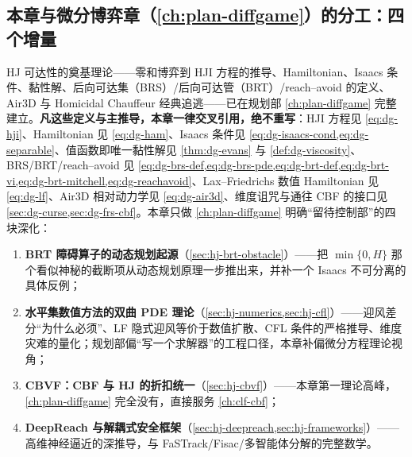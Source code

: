 \subsection*{本章与微分博弈章（\texorpdfstring{\cref{ch:plan-diffgame}}{差分博弈章}）的分工：四个增量}

HJ 可达性的奠基理论——零和博弈到 HJI 方程的推导、Hamiltonian、Isaacs 条件、黏性解、后向可达集（BRS）/后向可达管（BRT）/reach--avoid 的定义、Air3D 与 Homicidal Chauffeur 经典追逃——已在规划部 \cref{ch:plan-diffgame} 完整建立。\textbf{凡这些定义与主推导，本章一律交叉引用，绝不重写}：HJI 方程见 \cref{eq:dg-hji}、Hamiltonian 见 \cref{eq:dg-ham}、Isaacs 条件见 \cref{eq:dg-isaacs-cond,eq:dg-separable}、值函数即唯一黏性解见 \cref{thm:dg-evans} 与 \cref{def:dg-viscosity}、BRS/BRT/reach--avoid 见 \cref{eq:dg-brs-def,eq:dg-brs-pde,eq:dg-brt-def,eq:dg-brt-vi,eq:dg-brt-mitchell,eq:dg-reachavoid}、Lax--Friedrichs 数值 Hamiltonian 见 \cref{eq:dg-lf}、Air3D 相对动力学见 \cref{eq:dg-air3d}、维度诅咒与通往 CBF 的接口见 \cref{sec:dg-curse,sec:dg-frs-cbf}。本章只做 \cref{ch:plan-diffgame} 明确“留待控制部”的四块深化：

\begin{enumerate}
  \item \textbf{BRT 障碍算子的动态规划起源}（\cref{sec:hj-brt-obstacle}）——把 $\min\{0,H\}$ 那个看似神秘的截断项从动态规划原理一步推出来，并补一个 Isaacs 不可分离的具体反例；
  \item \textbf{水平集数值方法的双曲 PDE 理论}（\cref{sec:hj-numerics,sec:hj-cfl}）——迎风差分“为什么必须”、LF 隐式迎风等价于数值扩散、CFL 条件的严格推导、维度灾难的量化；规划部偏“写一个求解器”的工程口径，本章补偏微分方程理论视角；
  \item \textbf{CBVF：CBF 与 HJ 的折扣统一}（\cref{sec:hj-cbvf}）——本章第一理论高峰，\cref{ch:plan-diffgame} 完全没有，直接服务 \cref{ch:clf-cbf}；
  \item \textbf{DeepReach 与解耦式安全框架}（\cref{sec:hj-deepreach,sec:hj-frameworks}）——高维神经逼近的深推导，与 FaSTrack/Fisac/多智能体分解的完整数学。
\end{enumerate}

